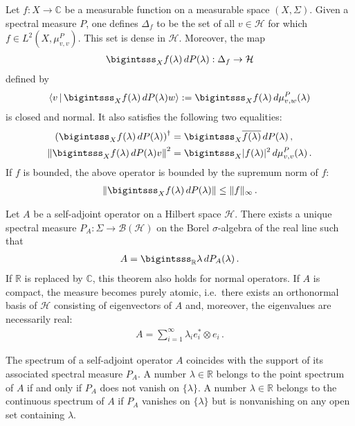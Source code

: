     \begin{property}
        Let $f:X\rightarrow\mathbb{C}$ be a measurable function on a measurable space $(X,\Sigma)$. Given a spectral measure $P$, one defines $\Delta_f$ to be the set of all $v\in\mathcal{H}$ for which $f\in L^2(X,\mu^P_{v,v})$. This set is dense in $\mathcal{H}$. Moreover, the map
        \begin{gather}
            \bigintsss_Xf(\lambda)\,dP(\lambda):\Delta_f\rightarrow\mathcal{H}
        \end{gather}
        defined by
        \begin{gather}
            \left\langle v\,\middle\vert\,\bigintsss_Xf(\lambda)\,dP(\lambda)w\right\rangle := \bigintsss_Xf(\lambda)\,d\mu^P_{v,w}(\lambda)
        \end{gather}
        is closed and normal. It also satisfies the following two equalities:
        \begin{align}
            \left(\bigintsss_Xf(\lambda)\,dP(\lambda)\right)^\dag &= \bigintsss_X\overline{f(\lambda)}\,dP(\lambda)\,,\\
            \left\|\bigintsss_Xf(\lambda)\,dP(\lambda)v\right\|^2 &= \bigintsss_X|f(\lambda)|^2\,d\mu^P_{v,v}(\lambda)\,.
        \end{align}
        If $f$ is bounded, the above operator is bounded by the supremum norm of $f$:
        \begin{gather}
            \left\|\bigintsss_Xf(\lambda)\,dP(\lambda)\right\|\leq\|f\|_\infty\,.
        \end{gather}
    \end{property}

    \begin{theorem}
        Let $A$ be a self-adjoint operator on a Hilbert space $\mathcal{H}$. There exists a unique spectral measure $P_A:\Sigma\rightarrow\mathcal{B}(\mathcal{H})$ on the Borel $\sigma$-algebra of the real line such that
        \begin{gather}
            A = \bigintsss_{\mathbb{R}}\lambda\,dP_A(\lambda)\,.
        \end{gather}
        If $\mathbb{R}$ is replaced by $\mathbb{C}$, this theorem also holds for normal operators. If $A$ is compact, the measure becomes purely atomic, i.e.~there exists an orthonormal basis of $\mathcal{H}$ consisting of eigenvectors of $A$ and, moreover, the eigenvalues are necessarily real:
        \begin{gather}
            A = \sum_{i=1}^\infty\lambda_ie_i^*\otimes e_i\,.
        \end{gather}
    \end{theorem}
    \begin{property}
        The spectrum of a self-adjoint operator $A$ coincides with the support of its associated spectral measure $P_A$. A number $\lambda\in\mathbb{R}$ belongs to the point spectrum of $A$ if and only if $P_A$ does not vanish on $\{\lambda\}$. A number $\lambda\in\mathbb{R}$ belongs to the continuous spectrum of $A$ if $P_A$ vanishes on $\{\lambda\}$ but is nonvanishing on any open set containing $\lambda$.
    \end{property}

